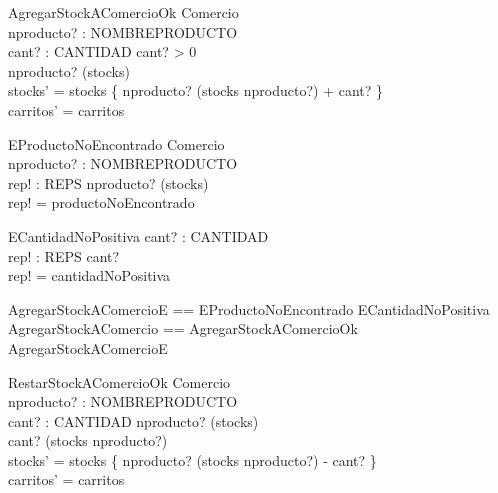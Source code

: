 \documentclass[11pt]{article}
\begin{document}

\begin{schema}{AgregarStockAComercioOk}
\Delta Comercio \\
nproducto? : NOMBREPRODUCTO \\
cant? : CANTIDAD
\where
cant? > 0 \\
nproducto? \in (\dom stocks) \\
stocks' = stocks \oplus \{ nproducto? \mapsto (stocks \; nproducto?) + cant? \} \\
carritos' = carritos
\end{schema}

\begin{schema}{EProductoNoEncontrado}
\Xi Comercio \\
nproducto? : NOMBREPRODUCTO \\
rep! : REPS
\where
nproducto? \notin (\dom stocks) \\
rep! = productoNoEncontrado
\end{schema}

\begin{schema}{ECantidadNoPositiva}
cant? : CANTIDAD \\
rep! : REPS
\where
cant?  \\
rep! = cantidadNoPositiva
\end{schema}

\begin{zed}
AgregarStockAComercioE == EProductoNoEncontrado \lor ECantidadNoPositiva \\
AgregarStockAComercio == AgregarStockAComercioOk \lor AgregarStockAComercioE
\end{zed}

\begin{schema}{RestarStockAComercioOk}
\Delta Comercio \\
nproducto? : NOMBREPRODUCTO \\
cant? : CANTIDAD
\where
nproducto? \in (\dom stocks) \\
cant? \leq (stocks \; nproducto?) \\
stocks' = stocks \oplus \{ nproducto? \mapsto (stocks \; nproducto?) - cant? \} \\
carritos' = carritos
\end{schema}
\end{document}
